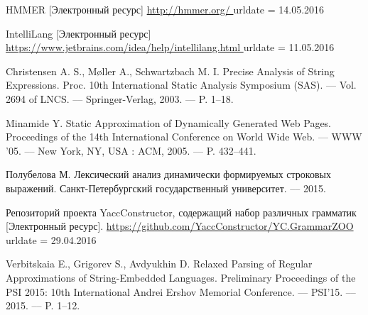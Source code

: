 \begin{thebibliography}{99}
  HMMER [Электронный ресурс]
  \url{http://hmmer.org/ }
  urldate = {14.05.2016}




    
  IntelliLang [Электронный ресурс]
  \url{ https://www.jetbrains.com/idea/help/intellilang.html }
  urldate = {11.05.2016}
                        
                                             
  Christensen A. S., M{\o}ller A., Schwartzbach M. I.
  Precise Analysis of String Expressions.
   Proc. 10th International Static Analysis Symposium (SAS). –– Vol. 2694 of LNCS. –– Springer-Verlag, 2003. –– P. 1–18.

  Minamide Y. 
  Static Approximation of Dynamically Generated Web Pages.
  Proceedings of the 14th International Conference on World Wide Web. –– WWW ’05. –– New York, NY, USA : ACM, 2005. –– P. 432–441.
                                         
  Полубелова М. 
  Лексический анализ динамически формируемых строковых выражений.
  Санкт-Петербургский государственный университет. –– 2015.
  

  Репозиторий проекта YaccConstructor, содержащий набор различных грамматик [Электронный ресурс].
  \url{https://github.com/YaccConstructor/YC.GrammarZOO}
  urldate = {29.04.2016}

  Verbitskaia E., Grigorev S., Avdyukhin D. 
  Relaxed Parsing of Regular Approximations of String-Embedded Languages.
  Preliminary Proceedings of the PSI 2015: 10th International Andrei Ershov Memorial Conference. –– PSI’15. –– 2015. –– P. 1–12.


\end{thebibliography}

